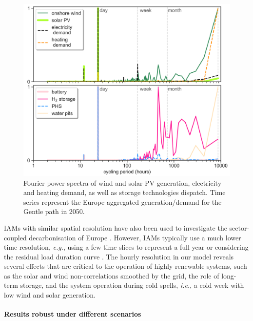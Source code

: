 \documentclass[5p]{elsarticle} %
\begin{document}
\begin{figure}[!h]
\centering
\includegraphics[width=\columnwidth]{figures/Fourier.png}
\caption{Fourier power spectra of wind and solar PV generation, electricity and heating demand, as well as storage technologies dispatch. Time series represent the Europe-aggregated generation/demand for the Gentle path in 2050.} \label{fig_Fourier} 
\end{figure}

IAMs with similar spatial resolution have also been used to investigate the sector-coupled decarbonisation of Europe \cite{in-depth_2018, JRC-EU-TIMES, Creutzig_2017}. However, IAMs typically use a much lower time resolution, \textit{e.g.}, using a few time slices to represent a full year \cite{JRC-EU-TIMES, Loffler_2019, Poncelet_2016, McGlade_2015, Babrowski_2014} or considering the residual load duration curve \cite{Creutzig_2017, Ueckerdt_2017}. The hourly resolution in our model reveals several effects that are critical to the operation of highly renewable systems, such as the solar and wind non-correlations smoothed by the grid, the role of long-term storage, and the system operation during cold spells, \textsl{i.e.}, a cold week with low wind and solar generation.

 
\paragraph{\textbf{Results robust under different scenarios}} \
\end{document}
